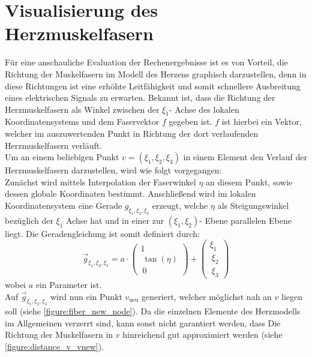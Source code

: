 \documentclass[
	a4paper,			%
	11pt,				%
	headsepline,		%
	bibtotoc,			%
	BCOR18mm,      		%
	DIV14,				%
	headings=normal,
	numbers=noenddot,
]{scrbook}
\theoremstyle{mythmstyle}
\theoremstyle{other}
\begin{document}
	\section{Visualisierung des Herzmuskelfasern}
	
	Für eine anschauliche Evaluation der Rechenergebnisse ist es von Vorteil, die Richtung der Muskelfasern
	im Modell des Herzens graphisch darzustellen, denn in diese Richtungen ist eine erhöhte Leitfähigkeit
	und somit schnellere Ausbreitung eines elektrischen Signals zu erwarten. Bekannt ist, dass die Richtung
	der Herzmuskelfasern als Winkel zwischen der $\xi_1$- Achse des lokalen Koordinatensystems und dem 
	Faservektor $f$ gegeben ist. $f$ ist hierbei ein Vektor, welcher im auszuwertenden Punkt in Richtung
	der dort verlaufenden Herzmuskelfasern verläuft.\\
	Um an einem beliebigen Punkt $v = (\xi_1,\xi_2,\xi_3)$ in einem Element den Verlauf der Herzmuskelfasern
	 darzustellen,
	 wird wie folgt vorgegangen:\\
	Zunächst wird mittels Interpolation der Faserwinkel $\eta$ an diesem Punkt, sowie dessen globale
	Koordinaten bestimmt. Anschließend wird im lokalen Koordinatensystem eine Gerade $g_{\xi_1,\xi_2,\xi_3}$
	 erzeugt,
	 welche $\eta$ als Steigungswinkel bezüglich der $\xi_1$
	Achse hat und in einer zur $(\xi_1,\xi_2)$- Ebene parallelen Ebene liegt. Die Geradengleichung ist somit
	 definiert durch:
	\begin{equation}
	\vec g_{\xi_1,\xi_2,\xi_3} =a \cdot  \left(\begin{array}{c}1\\\ \tan(\eta) \\\ 0 \end{array}\right) +
	 \left(\begin{array}{c}\xi_1\\\ \xi_2\\\ \xi_3\end{array}\right)
	 \label{eq:gerade_fiber}
	\end{equation}
	wobei $a$ ein Parameter ist.\\
	Auf $\vec g_{\xi_1,\xi_2,\xi_3}$ wird nun ein Punkt $v_{\text{neu}}$ generiert, welcher möglichst nah an $v$
	liegen soll (siehe \autoref{figure:fiber_new_node}). Da die einzelnen Elemente des Herzmodells
	 im Allgemeinen verzerrt sind, 
	 kann sonst nicht garantiert werden, dass  Die Richtung der Muskelfasern in $v$ hinreichend gut
	approximiert werden (siehe \autoref{figure:distance_v_vnew}). 
	
\end{document}
